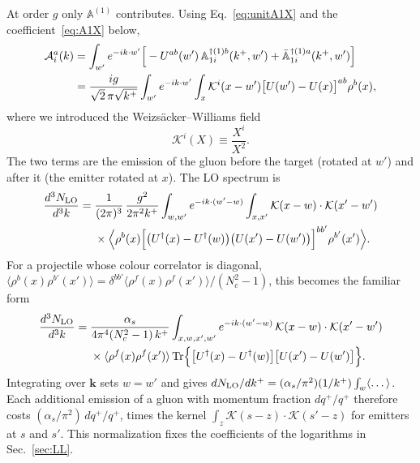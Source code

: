 \documentclass[aps,prd,onecolumn,superscriptaddress,nofootinbib,floatfix,longbibliography,11pt]{revtex4-2}
\numberwithin{equation}{section}
\newcommand{\KK}{\mathcal{K}}
\newcommand{\Ud}{U^{\dagger}}
\newcommand{\Tr}{\mathrm{Tr}}
\def\mf#1{\mathbb{#1}}
\begin{document}
At order $g$ only $\mf A^{(1)}$ contributes. Using Eq.~\eqref{eq:unitA1X} and the coefficient~\eqref{eq:A1X} below,
\begin{align}
\mathcal A^a_i(k)&=\int_{w'}e^{-ik\cdot w'}\Big[-U^{ab}(w')\,\mf A^{\dagger(1)b}_{1i}(k^+,w')+\bar{\mf A}^{\dagger(1)a}_{1i}(k^+,w')\Big]\notag\\
&=\frac{ig}{\sqrt2\,\pi\sqrt{k^+}}\int_{w'}e^{-ik\cdot w'}\int_x\KK^i(x-w')\big[U(w')-U(x)\big]^{ab}\rho^b(x),
\label{eq:ampLO}
\end{align}
where we introduced the Weizs\"acker--Williams field
\begin{equation}
\KK^i(X)\equiv\frac{X^i}{X^2}.
\end{equation}
The two terms are the emission of the gluon before the target (rotated at $w'$) and after it (the emitter rotated at $x$). The LO spectrum is
\begin{align}
\frac{d^3N_{\rm LO}}{d^3k}={}&\frac{1}{(2\pi)^3}\,\frac{g^2}{2\pi^2k^+}\int_{w,w'}e^{-ik\cdot(w'-w)}\int_{x,x'}\KK(x-w)\cdot\KK(x'-w')\notag\\
&\times\Big\langle\rho^b(x)\Big[\big(\Ud(x)-\Ud(w)\big)\big(U(x')-U(w')\big)\Big]^{bb'}\rho^{b'}(x')\Big\rangle.
\label{eq:LOop}
\end{align}
For a projectile whose colour correlator is diagonal, $\langle\rho^b(x)\rho^{b'}(x')\rangle=\delta^{bb'}\langle\rho^f(x)\rho^f(x')\rangle/(N_c^2-1)$, this becomes the familiar form~\cite{Kovchegov:2001sc,Dumitru:2001ux,Blaizot:2004wu}
\begin{align}
\frac{d^3N_{\rm LO}}{d^3k}={}&\frac{\alpha_s}{4\pi^4(N_c^2-1)\,k^+}\int_{x,w,x',w'}e^{-ik\cdot(w'-w)}\,\KK(x-w)\cdot\KK(x'-w')\notag\\
&\times\langle\rho^f(x)\rho^f(x')\rangle\,\Tr\Big\{\big[\Ud(x)-\Ud(w)\big]\big[U(x')-U(w')\big]\Big\}.
\label{eq:LO}
\end{align}
Integrating over $\mathbf k$ sets $w=w'$ and gives $dN_{\rm LO}/dk^+=(\alpha_s/\pi^2)(1/k^+)\int_w\langle\dots\rangle$. Each additional emission of a gluon with momentum fraction $dq^+/q^+$ therefore costs $(\alpha_s/\pi^2)\,dq^+/q^+$, times the kernel $\int_z\KK(s-z)\cdot\KK(s'-z)$ for emitters at $s$ and $s'$. This normalization fixes the coefficients of the logarithms in Sec.~\ref{sec:LL}.
\end{document}
